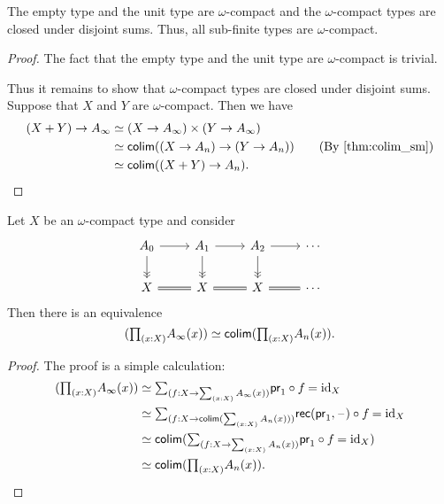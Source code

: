 \begin{lem}
The empty type and the unit type are $\omega$-compact and the $\omega$-compact types are closed under
disjoint sums. Thus, all sub-finite types are $\omega$-compact.
\end{lem}

\begin{proof}
The fact that the empty type and the unit type are $\omega$-compact is trivial.

Thus it remains to show that $\omega$-compact types are closed under disjoint
sums. Suppose that $X$ and $Y$ are $\omega$-compact. Then we have
\begin{align*}
(X+Y)\to A_\infty & \eqvsym (X\to A_\infty)\times(Y\to A_\infty) \\
& \eqvsym \tfcolim((X\to A_n)\to (Y\to A_n)) \tag{By \autoref{thm:colim_sm}} \\
& \eqvsym \tfcolim((X+Y)\to A_n).
\end{align*}
\end{proof}

\begin{lem}
Let $X$ be an $\omega$-compact type and consider
\begin{equation*}
\begin{tikzcd}
A_{0} \arrow[r] \arrow[d,->>] & A_{1} \arrow[r] \arrow[d,->>] & A_{2} \arrow[r] \arrow[d,->>] & \cdots \\
X \arrow[r,equals] & X \arrow[r,equals] & X \arrow[r,equals] & \cdots
\end{tikzcd}
\end{equation*}
Then there is an equivalence
\begin{equation*}
\eqv{(\prd{x:X} A_\infty(x))}{\tfcolim(\prd{x:X}A_n(x))}.
\end{equation*}
\end{lem}

\begin{proof}
The proof is a simple calculation:
\begin{align*}
(\prd{x:X} A_\infty(x)) & \eqvsym \sm{f:X\to\sm{x:X}A_\infty(x)}\id{\fst\circ f}{\catid{X}} \\
& \eqvsym \sm{f:X\to\tfcolim(\sm{x:X} A_n(x))}\id{\mathsf{rec}(\fst,\blank)\circ f}{\catid{X}} \\
& \eqvsym \tfcolim(\sm{f:X\to\sm{x:X}A_n(x)} \id{\fst\circ f}{\catid{X}}) \\
& \eqvsym \tfcolim(\prd{x:X}A_n(x)).\qedhere
\end{align*}
\end{proof}

